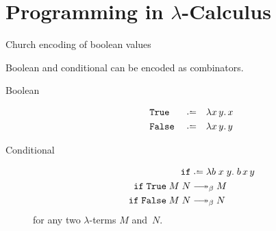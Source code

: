 \section{Programming in \texorpdfstring{$\lambda$}{λ}-Calculus}
\begin{frame}{Church encoding of boolean values}
  
Boolean and conditional can be encoded as combinators.
  
\begin{description}
  \item[Boolean]
    \begin{align*}
      & \mathtt{True}  && \defeq && \lambda x\,y.\, x \\
      & \mathtt{False} && \defeq && \lambda x\,y.\, y
    \end{align*}

  \item[Conditional]
    \begin{align*}
      \mathtt{if} & \defeq \lambda b\;x\;y.\;b\,x\,y  \\
      \mathtt{if} \;\mathtt{True} \;M\;N &\reduce M \\
      \mathtt{if} \;\mathtt{False}\;M\;N &\reduce N
    \end{align*}
    for any two $\lambda$-terms $M$ and~$N$.
\end{description}

\end{frame}
